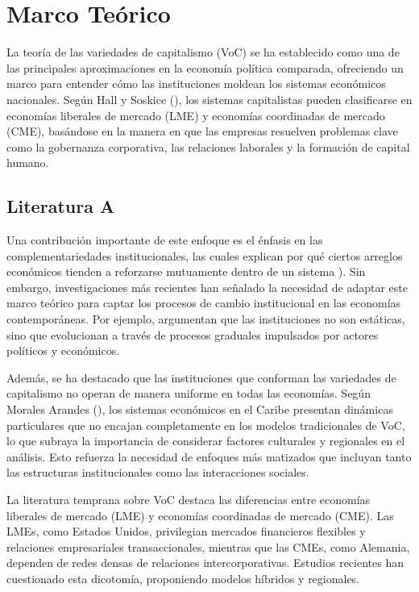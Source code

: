 \documentclass[12pt]{article}
\begin{document}
\lipsum[2]

\section{Marco Teórico}
La teoría de las variedades de capitalismo (VoC) se ha establecido como una de las principales aproximaciones en la economía política comparada, ofreciendo un marco para entender cómo las instituciones moldean los sistemas económicos nacionales. Según Hall y Soskice (\citeyear{hall2001introduction}), los sistemas capitalistas pueden clasificarse en economías liberales de mercado (LME) y economías coordinadas de mercado (CME), basándose en la manera en que las empresas resuelven problemas clave como la gobernanza corporativa, las relaciones laborales y la formación de capital humano. 

\lipsum[2]

\subsection{Literatura A}

Una contribución importante de este enfoque es el énfasis en las complementariedades institucionales, las cuales explican por qué ciertos arreglos económicos tienden a reforzarse mutuamente dentro de un sistema \citep{hall2001introduction}). Sin embargo, investigaciones más recientes han señalado la necesidad de adaptar este marco teórico para captar los procesos de cambio institucional en las economías contemporáneas. Por ejemplo, \citet{hall2009institutional} argumentan que las instituciones no son estáticas, sino que evolucionan a través de procesos graduales impulsados por actores políticos y económicos.

Además, se ha destacado que las instituciones que conforman las variedades de capitalismo no operan de manera uniforme en todas las economías. Según Morales Arandes (\citeyear{morales2002}), los sistemas económicos en el Caribe presentan dinámicas particulares que no encajan completamente en los modelos tradicionales de VoC, lo que subraya la importancia de considerar factores culturales y regionales en el análisis. Esto refuerza la necesidad de enfoques más matizados que incluyan tanto las estructuras institucionales como las interacciones sociales.

\lipsum

La literatura temprana sobre VoC destaca las diferencias entre economías liberales de mercado (LME) y economías coordinadas de mercado (CME). Las LMEs, como Estados Unidos, privilegian mercados financieros flexibles y relaciones empresariales transaccionales, mientras que las CMEs, como Alemania, dependen de redes densas de relaciones intercorporativas. Estudios recientes han cuestionado esta dicotomía, proponiendo modelos híbridos y regionales.
\end{document}
